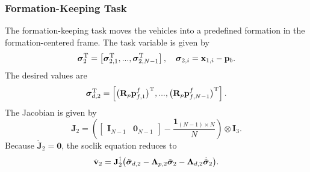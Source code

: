 \subsubsection{Formation-Keeping Task}
The formation-keeping task moves the vehicles into a predefined formation in the formation-centered frame. The task variable is given by
\begin{equation}
    \bm{\sigma}_2^{\mathrm{T}} = \left[ \bm{\sigma}_{2,1}^{\mathrm{T}}, ..., \bm{\sigma}_{2,N-1}^{\mathrm{T}}\right], \quad \bm{\sigma}_{2,i}  = \mathbf{x}_{1,i} - \mathbf{p}_b.
\end{equation}
The desired values are
\begin{equation}
    \bm{\sigma}_{d,2}^{\mathrm{T}} = \left[\bigl(\mathbf{R}_p \mathbf{p}_{f,1}^f\bigr)^{\mathrm{T}}, ..., \bigl(\mathbf{R}_p \mathbf{p}_{f,N-1}^f\bigr)^{\mathrm{T}} \right].
\end{equation}
The Jacobian is given by 
\begin{equation}
    \mathbf{J}_2 = \left(\begin{bmatrix}
        \mathbf{I}_{N-1} & \mathbf{0}_{N-1}
    \end{bmatrix} - \frac{\mathbf{1}_{(N-1) \times N}}{N}\right)\otimes \mathbf{I}_3.
\end{equation}
Because $\dot{\mathbf{J}}_2 = \mathbf{0}$, the \gls{soclik} equation reduces to
\begin{equation}\label{eq:formation_keeping_controller}
    \dot{\mathbf{v}}_2 = \mathbf{J}_2^\dagger \bigl(\ddot{\bm{\sigma}}_{d,2} - \mathbf{\Lambda}_{p,2}\Tilde{\bm{\sigma}}_2 - \mathbf{\Lambda}_{d,2} \dot{\Tilde{\bm{\sigma}}}_2\bigr).
\end{equation}

